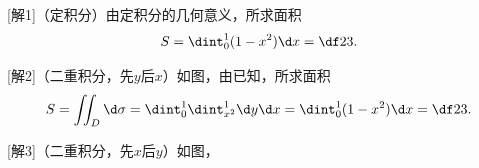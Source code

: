 \begin{center}
\end{center}

[解1]（定积分）由定积分的几何意义，所求面积
$$S=\dint_0^1(1-x^2)\d x=\df23.$$

[解2]（二重积分，先$y$后$x$）如图，由已知，所求面积
$$S=\iint_D\d\sigma=\dint_0^1\dint_{x^2}^1\d y\d x
=\dint_0^1(1-x^2)\d x=\df23.$$

[解3]（二重积分，先$x$后$y$）如图，

